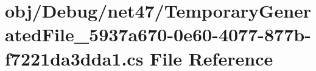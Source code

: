 \hypertarget{_debug_2net47_2_temporary_generated_file__5937a670-0e60-4077-877b-f7221da3dda1_8cs}{}\section{obj/\+Debug/net47/\+Temporary\+Generated\+File\+\_\+5937a670-\/0e60-\/4077-\/877b-\/f7221da3dda1.cs File Reference}
\label{_debug_2net47_2_temporary_generated_file__5937a670-0e60-4077-877b-f7221da3dda1_8cs}
